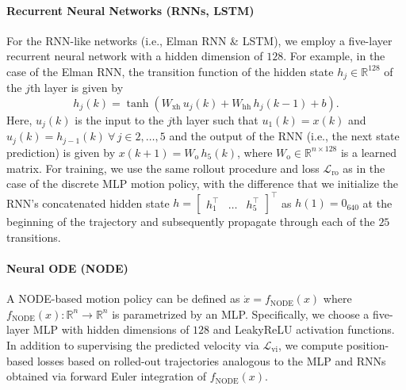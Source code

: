 \paragraph{Recurrent Neural Networks (RNNs, LSTM)}
For the RNN-like networks (i.e., Elman \gls{RNN} \& \gls{LSTM}), we employ a five-layer recurrent neural network with a hidden dimension of $128$.
For example, in the case of the Elman \gls{RNN}, the transition function of the hidden state $h_j \in \mathbb{R}^{128}$ of the $j$th layer is given by
\begin{equation}
    h_j(k) = \tanh \left (W_\mathrm{xh} \, u_j(k) + W_\mathrm{hh} \, h_j(k-1) + b \right ).
\end{equation}
Here, $u_j(k)$ is the input to the $j$th layer such that $u_1(k) = x(k)$ and $u_j(k) = h_{j-1}(k) \: \forall \, j \in 2, \dots, 5$ and the output of the \gls{RNN} (i.e., the next state prediction) is given by $x(k+1) = W_\mathrm{o} \, h_5(k)$, where $W_\mathrm{o} \in \mathbb{R}^{n \times 128}$ is a learned matrix.
For training, we use the same rollout procedure and loss $\mathcal{L}_\mathrm{ro}$ as in the case of the discrete MLP motion policy, with the difference that we initialize the RNN's concatenated hidden state $h = \begin{bmatrix}
    h_1^\top & \dots & h_5^\top
\end{bmatrix}^\top$ as $h(1) = 0_{640}$ at the beginning of the trajectory and subsequently propagate through each of the $25$ transitions. 

\paragraph{Neural ODE (NODE)}
A \gls{NODE}-based motion policy can be defined as $\dot{x} = f_\mathrm{NODE}(x)$ where $f_\mathrm{NODE}(x): \mathbb{R}^n \to \mathbb{R}^n$ is parametrized by an MLP. Specifically, we choose a five-layer MLP with hidden dimensions of $128$ and LeakyReLU activation functions.
In addition to supervising the predicted velocity via $\mathcal{L}_\mathrm{vi}$, we compute position-based losses based on rolled-out trajectories analogous to the MLP and RNNs obtained via forward Euler integration of $f_\mathrm{NODE}(x)$.

